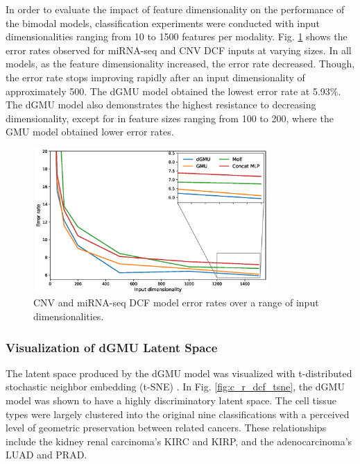 In order to evaluate the impact of feature dimensionality on the performance of the bimodal models, classification experiments were conducted with input dimensionalities ranging from 10 to 1500 features per modality. Fig. \ref{fig:exp82} shows the error rates observed for miRNA-seq and CNV DCF inputs at varying sizes. In all models, as the feature dimensionality increased, the error rate decreased. Though, the error rate stops improving rapidly after an input dimensionality of approximately 500. The dGMU model obtained the lowest error rate at 5.93\%. The dGMU model also demonstrates the highest resistance to decreasing dimensionality, except for in feature sizes ranging from 100 to 200, where the GMU model obtained lower error rates.

\begin{figure}[h!]
    \centering
    \includegraphics[height=5.5cm,width=0.80\textwidth]{img/c_r/exp82.eps}
    \caption{CNV and miRNA-seq DCF model error rates over a range of input dimensionalities.}
    \label{fig:exp82}
\end{figure}

\subsubsection{Visualization of dGMU Latent Space} 

The latent space produced by the dGMU model was visualized with t-distributed stochastic neighbor embedding (t-SNE) \cite{maaten2008visualizing}. In Fig. \ref{fig:c_r_dcf_tsne}, the dGMU model was shown to have a highly discriminatory latent space. The cell tissue types were largely clustered into the original nine classifications with a perceived level of geometric preservation between related cancers. These relationships include the kidney renal carcinoma's KIRC and KIRP, and the adenocarcinoma's LUAD and PRAD.

